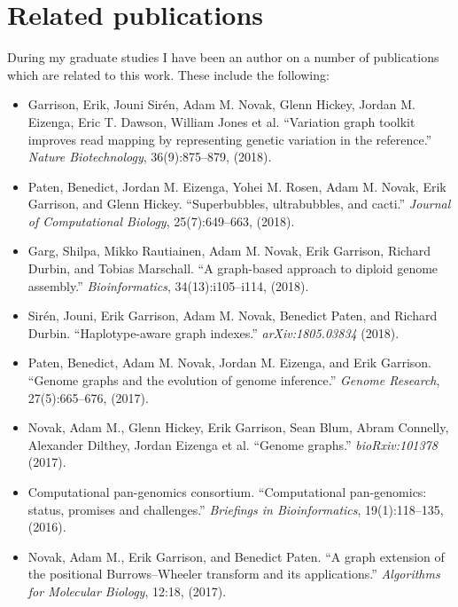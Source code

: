 \chapter{Related publications}

During my graduate studies I have been an author on a number of publications which are related to this work.
These include the following:

\begin{itemize}[noitemsep]

\item Garrison, Erik, Jouni Sirén, Adam M. Novak, Glenn Hickey, Jordan M. Eizenga, Eric T. Dawson, William Jones et al. ``Variation graph toolkit improves read mapping by representing genetic variation in the reference.'' \emph{Nature Biotechnology}, 36(9):875--879, (2018).

\item Paten, Benedict, Jordan M. Eizenga, Yohei M. Rosen, Adam M. Novak, Erik Garrison, and Glenn Hickey. ``Superbubbles, ultrabubbles, and cacti.'' \emph{Journal of Computational Biology}, 25(7):649--663, (2018).

\item Garg, Shilpa, Mikko Rautiainen, Adam M. Novak, Erik Garrison, Richard Durbin, and Tobias Marschall. ``A graph-based approach to diploid genome assembly.'' \emph{Bioinformatics}, 34(13):i105--i114, (2018).

\item Sirén, Jouni, Erik Garrison, Adam M. Novak, Benedict Paten, and Richard Durbin. ``Haplotype-aware graph indexes.'' \emph{arXiv:1805.03834} (2018).

\item Paten, Benedict, Adam M. Novak, Jordan M. Eizenga, and Erik Garrison. ``Genome graphs and the evolution of genome inference.'' \emph{Genome Research}, 27(5):665--676, (2017).

\item Novak, Adam M., Glenn Hickey, Erik Garrison, Sean Blum, Abram Connelly, Alexander Dilthey, Jordan Eizenga et al. ``Genome graphs.'' \emph{bioRxiv:101378} (2017).

\item Computational pan-genomics consortium. ``Computational pan-genomics: status, promises and challenges.'' \emph{Briefings in Bioinformatics}, 19(1):118--135, (2016).

\item Novak, Adam M., Erik Garrison, and Benedict Paten. ``A graph extension of the positional Burrows–Wheeler transform and its applications.'' \emph{Algorithms for Molecular Biology}, 12:18, (2017).

\end{itemize}

